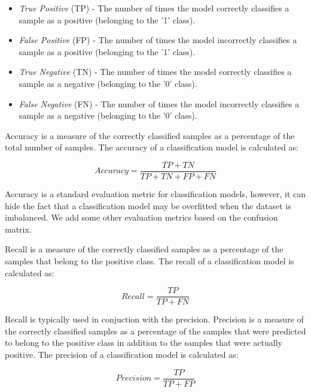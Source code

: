 \documentclass[12pt]{article}
\begin{document}
\begin{itemize}
    \item \textit{True Positive} (TP) - The number of times the model correctly
          classifies a sample as a positive (belonging to the '1' class).
    \item \textit{False Positive} (FP) - The number of times the model incorrectly
          classifies a sample as a positive (belonging to the '1' class).
    \item \textit{True Negative} (TN) - The number of times the model correctly
          classifies a sample as a negative (belonging to the '0' class).
    \item \textit{False Negative} (FN) - The number of times the model incorrectly
          classifies a sample as a negative (belonging to the '0' class).
\end{itemize}

Accuracy is a measure of the correctly classified samples as a percentage of
the total number of samples. The accuracy of a classification model is
calculated as:

\begin{equation}
    \textit{Accuracy} = \frac{TP + TN}{TP + TN + FP + FN}
\end{equation}

Accuracy is a standard evaluation metric for classification models, however, it
can hide the fact that a classification model may be overfitted when the dataset
is imbalanced. We add some other evaluation metrics based on the confusion
matrix.

\newpage
Recall is a measure of the correctly classified samples as a
percentage of the samples that belong to the positive class. The recall of a
classification model is calculated as:

\begin{equation}
    \textit{Recall} = \frac{TP}{TP + FN}
\end{equation}

Recall is typically used in conjuction with the precision. Precision is a
measure of the correctly classified samples as a percentage of the samples that
were predicted to belong to the positive class in addition to the samples that
were actually positive. The precision of a classification model is calculated
as:

\begin{equation}
    \textit{Precision} = \frac{TP}{TP + FP}
\end{equation}
\end{document}
